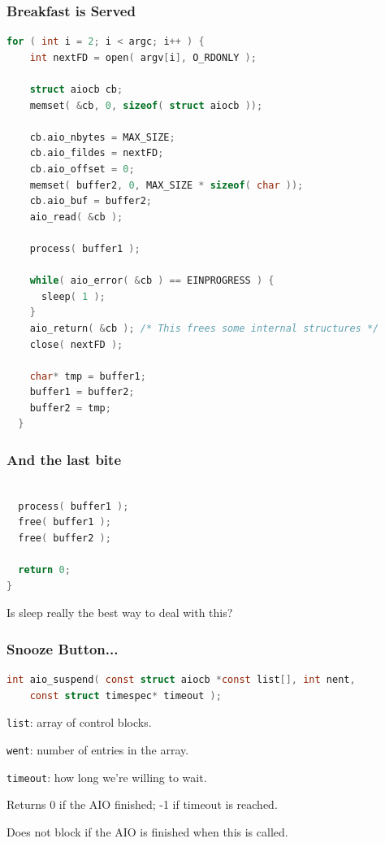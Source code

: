 \begin{frame}[fragile]
	\frametitle{Breakfast is Served}

	\begin{lstlisting}[language=C]
  for ( int i = 2; i < argc; i++ ) {
    int nextFD = open( argv[i], O_RDONLY );
    
    struct aiocb cb;
    memset( &cb, 0, sizeof( struct aiocb ));
    
    cb.aio_nbytes = MAX_SIZE;
    cb.aio_fildes = nextFD;
    cb.aio_offset = 0;
    memset( buffer2, 0, MAX_SIZE * sizeof( char ));
    cb.aio_buf = buffer2;
    aio_read( &cb );
 
    process( buffer1 );
    
    while( aio_error( &cb ) == EINPROGRESS ) {
      sleep( 1 );
    }
    aio_return( &cb ); /* This frees some internal structures */
    close( nextFD );
    
    char* tmp = buffer1;
    buffer1 = buffer2;
    buffer2 = tmp;
  }
\end{lstlisting}


\end{frame}

\begin{frame}[fragile]
	\frametitle{And the last bite}

	\begin{lstlisting}[language=C]
  
  process( buffer1 );
  free( buffer1 );
  free( buffer2 );

  return 0;
}
\end{lstlisting}

	Is sleep really the best way to deal with this?

\end{frame}


\begin{frame}[fragile]
	\frametitle{Snooze Button...}
	\begin{lstlisting}[language=C]
int aio_suspend( const struct aiocb *const list[], int nent, 
    const struct timespec* timeout );
\end{lstlisting}

	\texttt{list}: array of control blocks.

	\texttt{went}: number of entries in the array.

	\texttt{timeout}: how long we're willing to wait.

	Returns 0 if the AIO finished; -1 if timeout is reached.

	Does not block if the AIO is finished when this is called.

\end{frame}


